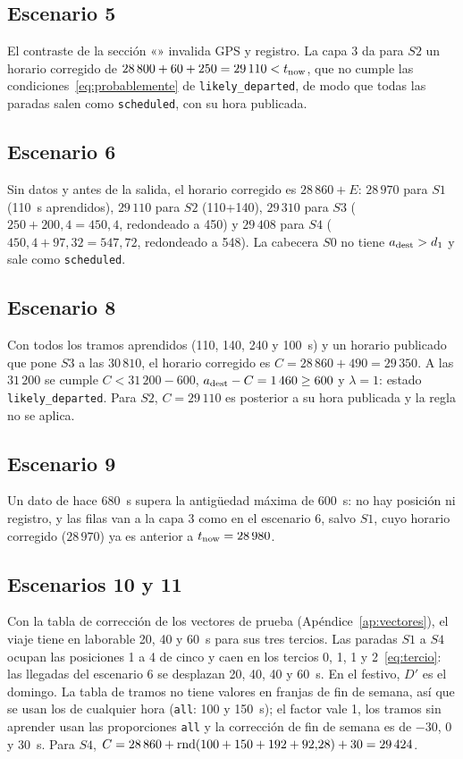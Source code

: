 \subsection{Escenario 5} El contraste de la sección «» invalida GPS y registro. La capa 3 da para
$S2$ un horario corregido de $28\,800+60+250=29\,110<t_{\mathrm{now}}$, que no cumple las condiciones~\eqref{eq:probablemente}
de \texttt{likely\_departed}, de modo que todas las paradas salen como \texttt{scheduled}, con su hora publicada.

\subsection{Escenario 6} Sin datos y antes de la salida, el horario corregido es $28\,860+E$: $28\,970$ para $S1$
(110~s aprendidos), $29\,110$ para $S2$ (110+140), $29\,310$ para $S3$ ($250+200{,}4=450{,}4$, redondeado a 450) y
$29\,408$ para $S4$ ($450{,}4+97{,}32=547{,}72$, redondeado a 548). La cabecera $S0$ no tiene $a_{\mathrm{dest}}>d_1$ y sale como
\texttt{scheduled}.

\subsection{Escenario 8} Con todos los tramos aprendidos (110, 140, 240 y 100~s) y un horario publicado que pone
$S3$ a las $30\,810$, el horario corregido es $C=28\,860+490=29\,350$. A las $31\,200$ se cumple $C<31\,200-600$,
$a_{\mathrm{dest}}-C=1\,460\ge600$ y $\lambda=1$: estado \texttt{likely\_departed}. Para $S2$, $C=29\,110$ es posterior a su hora
publicada y la regla no se aplica.

\subsection{Escenario 9} Un dato de hace 680~s supera la antigüedad máxima de 600~s: no hay posición ni registro, y
las filas van a la capa 3 como en el escenario 6, salvo $S1$, cuyo horario corregido ($28\,970$) ya es anterior a
$t_{\mathrm{now}}=28\,980$.

\subsection{Escenarios 10 y 11} Con la tabla de corrección de los vectores de prueba (Apéndice~\ref{ap:vectores}), el
viaje tiene en laborable 20, 40 y 60~s para sus tres tercios. Las paradas $S1$ a $S4$ ocupan las posiciones 1 a 4 de
cinco y caen en los tercios 0, 1, 1 y 2~\eqref{eq:tercio}: las llegadas del escenario 6 se desplazan 20, 40, 40 y
60~s. En el festivo, $D'$ es el domingo. La tabla de tramos no tiene valores en franjas de fin de semana, así que se
usan los de cualquier hora (\texttt{all}: 100 y 150~s); el factor vale 1, los tramos sin aprender usan las proporciones
\texttt{all} y la corrección de fin de semana es de $-30$, 0 y 30~s. Para $S4$, $C=28\,860+\operatorname{rnd}(100+150+192+92{,}28)+30=29\,424$.

